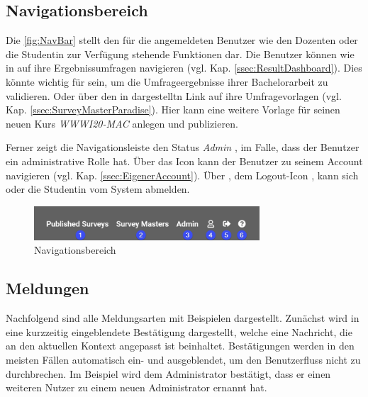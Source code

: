 \subsection{Navigationsbereich}
\label{ssec:NavBar}

Die \abb \vref{fig:NavBar} stellt den für die angemeldeten Benutzer wie \zb den Dozenten \duzi oder die Studentin \ariane zur Verfügung stehende Funktionen dar. 
Die Benutzer können wie in \desOne auf ihre Ergebnissumfragen navigieren (vgl. Kap. \vref{ssec:ResultDashboard}). 
Dies könnte \ua wichtig für \ariane sein, um die Umfrageergebnisse ihrer Bachelorarbeit zu validieren. 
Oder über den in \desTwo dargestelltn Link auf ihre Umfragevorlagen (vgl. Kap. \vref{ssec:SurveyMasterParadise}). 
Hier kann \zb \duzi eine weitere Vorlage für seinen neuen Kurs \emph{WWWI20-MAC} anlegen und publizieren. 
 
Ferner zeigt die Navigationsleiste den Status \emph{Admin} \desThree, im Falle, dass der Benutzer ein administrative Rolle hat. \newline
Über das Icon \faUser[regular]\xspace \desFour kann der Benutzer zu seinem Account navigieren (vgl. Kap. \vref{ssec:EigenerAccount}). \newline
Über \desFive, dem Logout-Icon \faSignOut*\xspace, kann sich \duzi oder die Studentin \ariane vom System abmelden. 

\begin{figure}[H]
	\centering
	\includegraphics[width=0.75\textwidth, keepaspectratio]{img/guide/NavBar.png}
	\captionsetup{justification=centering, format=plain}
	\caption[Navigationsbereich]{Navigationsbereich \\\quelleScreenshot}
	\label{fig:NavBar}
\end{figure}

\subsection{Meldungen}
\label{ssec:Meldungen}

Nachfolgend sind alle Meldungsarten mit Beispielen dargestellt.
Zunächst wird in  eine kurzzeitig eingeblendete Bestätigung dargestellt, welche eine Nachricht, die an den aktuellen Kontext angepasst ist beinhaltet.
Bestätigungen werden in den meisten Fällen automatisch ein- und ausgeblendet, um den Benutzerfluss nicht zu durchbrechen.
Im Beispiel wird dem Administrator bestätigt, dass er einen weiteren Nutzer zu einem neuen Administrator ernannt hat.

